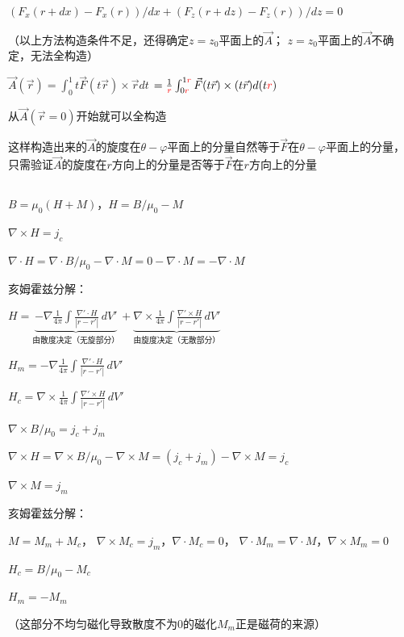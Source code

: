 $(F_x(r+dx)-F_x(r))/dx+(F_z(r+dz)-F_z(r))/dz=0$

\bigskip

（以上方法构造条件不足，还得确定$z=z_0$平面上的$\vec{A}$；
$z=z_0$平面上的$\vec{A}$不确定，无法全构造）

\bigskip

$\vec{A}(\vec{r})=\int_{0}^{1} t\vec{F}(t\vec{r})\times\vec{r} dt$
$=\frac{1}{\textcolor{red}{r}}\int_{0\textcolor{red}{r}}^{1\textcolor{red}{r}} \vec{F}(t\vec{r})\times(t\vec{r}) d(t\textcolor{red}{r})$

从$\vec{A}(\vec{r}=0)$开始就可以全构造

这样构造出来的$\vec{A}$的旋度在$\theta-\varphi$平面上的分量自然等于$\vec{F}$在$\theta-\varphi$平面上的分量，
只需验证$\vec{A}$的旋度在$r$方向上的分量是否等于$\vec{F}$在$r$方向上的分量

\subsection{}

$B = \mu_0(H+M)$，$H=B/\mu_0-M$

$\nabla\times H = j_c$

$\nabla \cdot H=\nabla \cdot B/\mu_0-\nabla \cdot M=0-\nabla \cdot M=-\nabla \cdot M$

亥姆霍兹分解：

$H = \underbrace{-\nabla\frac{1}{4\pi}\int\frac{\nabla'\cdot H}{|r-r'|}\,dV'}_{\text{由散度决定（无旋部分）}} + \underbrace{\nabla\times\frac{1}{4\pi}\int\frac{\nabla'\times H}{|r-r'|}\,dV'}_{\text{由旋度决定（无散部分）}}$

$H_m=-\nabla\frac{1}{4\pi}\int\frac{\nabla'\cdot H}{|r-r'|}\,dV'$

$H_c=\nabla\times\frac{1}{4\pi}\int\frac{\nabla'\times H}{|r-r'|}\,dV'$

\bigskip

$\nabla \times B/\mu_0=j_c+j_m$

$\nabla \times H=\nabla \times B/\mu_0-\nabla \times M=(j_c+j_m)-\nabla \times M=j_c$

$\nabla \times M=j_m$

亥姆霍兹分解：

$M=M_m+M_c$，
$\nabla \times M_c=j_m$，$\nabla \cdot M_c=0$，
$\nabla \cdot M_m=\nabla \cdot M$，$\nabla \times M_m=0$

$H_c=B/\mu_0-M_c$

$H_m=-M_m$

（这部分不均匀磁化导致散度不为0的磁化$M_m$正是磁荷的来源）


